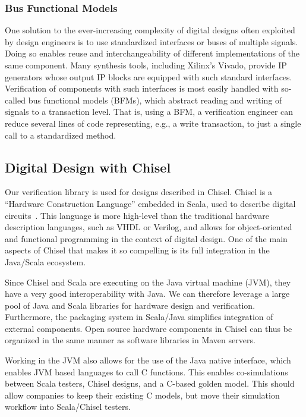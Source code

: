 \documentclass[conference]{IEEEtran}
\begin{document}
\subsubsection{Bus Functional Models}
One solution to the ever-increasing complexity of digital designs often exploited by design engineers is to use standardized interfaces or buses of multiple signals. Doing so enables reuse and interchangeability of different implementations of the same component. Many synthesis tools, including Xilinx's Vivado, provide IP generators whose output IP blocks are equipped with such standard interfaces. Verification of components with such interfaces is most easily handled with so-called bus functional models (BFMs), which abstract reading and writing of signals to a transaction level. That is, using a BFM, a verification engineer can reduce several lines of code representing, e.g., a write transaction, to just a single call to a standardized method.


\subsection{Digital Design with Chisel}
Our verification library is used for designs described in Chisel.
Chisel is a ``Hardware Construction Language'' embedded in Scala, used to describe digital circuits~\cite{chisel:dac2012}.
This language is more high-level than the traditional hardware description languages, such as VHDL or Verilog, and allows for object-oriented and functional programming in the context of digital design.
One of the main aspects of Chisel that makes it so compelling is its full integration in the Java/Scala ecosystem.

Since Chisel and Scala are executing on the Java virtual machine (JVM), they have a very good interoperability with Java. 
We can therefore leverage a large pool of Java and Scala libraries for hardware design and verification. 
Furthermore, the packaging system in Scala/Java simplifies integration of external components.
Open source hardware components in Chisel can thus be organized in the same manner as software libraries in Maven servers.

Working in the JVM also allows for the use of the Java native interface, which enables JVM based languages to call C functions.
This enables co-simulations between Scala testers, Chisel designs, and a C-based golden model. 
This should allow companies to keep their existing C models, but move their simulation workflow into Scala/Chisel testers.
\end{document}
